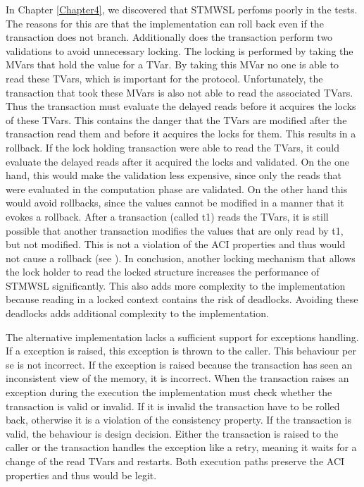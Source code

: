 In Chapter \ref{Chapter4}, we discovered that STMWSL perfoms poorly in the tests. The reasons for this are 
that the implementation can roll back even if the transaction does not branch. Additionally does the 
transaction perform two validations to avoid unnecessary locking. The locking is performed by taking
the MVars that hold the value for a TVar. By taking this MVar no one is able to read these TVars, which 
is important for the protocol. Unfortunately, the transaction that took these MVars is also not able to read 
the associated TVars. Thus the transaction must evaluate the delayed reads before it acquires the locks of these 
TVars. This contains the danger that the TVars are modified after the transaction read them and before
it acquires the locks for them. This results in a rollback. If the lock holding transaction were able 
to read the TVars, it could evaluate the delayed reads after it acquired the locks and validated. On the
one hand, this would make the validation less expensive, since only the reads that were evaluated in the 
computation phase are validated. On the other hand this would avoid rollbacks, since the values cannot 
be modified in a manner that it evokes a rollback. After a transaction (called t1) reads the TVars, it is 
still possible that another transaction modifies the values that are only read by t1, but not modified.
This is not a violation of the ACI properties and thus would not cause a rollback (see \parencite{lockfreedom}).
In conclusion, another locking mechanism that allows the lock holder to read the locked structure
increases the performance of STMWSL significantly. This also adds more complexity to the implementation
because reading in a locked context contains the risk of deadlocks. Avoiding these deadlocks adds 
additional complexity to the implementation.

The alternative implementation lacks a sufficient support for exceptions handling. If a exception is
raised, this exception is thrown to the caller. This behaviour per se is not incorrect. If the 
exception is raised because the transaction has seen an inconsistent view of the memory, it is 
incorrect. When the transaction raises an exception during the execution the implementation must 
check whether the transaction is valid or invalid. If it is invalid the transaction have to be rolled 
back, otherwise it is a violation of the consistency property. If the transaction is valid, the 
behaviour is design decision. Either the transaction is raised to the caller or the transaction 
handles the exception like a retry, meaning it waits for a change of the read TVars and restarts.
Both execution paths preserve the ACI properties and thus would be legit. 

